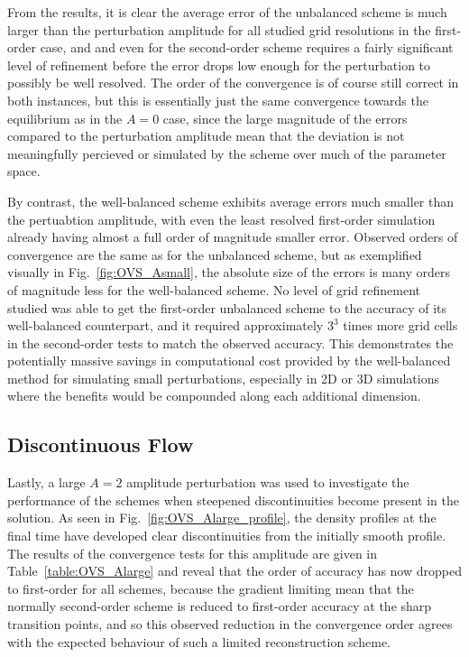From the results, it is clear the average error of the unbalanced scheme is much larger than the perturbation amplitude for all studied grid resolutions in the first-order case, and and even for the second-order scheme requires a fairly significant level of refinement before the error drops low enough for the perturbation to possibly be well resolved. The order of the convergence is of course still correct in both instances, but this is essentially just the same convergence towards the equilibrium as in the $A=0$ case, since the large magnitude of the errors compared to the perturbation amplitude mean that the deviation is not meaningfully percieved or simulated by the scheme over much of the parameter space.

By contrast, the well-balanced scheme exhibits average errors much smaller than the pertuabtion amplitude, with even the least resolved first-order simulation already having almost a full order of magnitude smaller error. Observed orders of convergence are the same as for the unbalanced scheme, but as exemplified visually in Fig.~\ref{fig:OVS_Asmall}, the absolute size of the errors is many orders of magnitude less for the well-balanced scheme. No level of grid refinement studied was able to get the first-order unbalanced scheme to the accuracy of its well-balanced counterpart, and it required approximately $3^3$ times more grid cells in the second-order tests to match the observed accuracy. This demonstrates the potentially massive savings in computational cost provided by the well-balanced method for simulating small perturbations, especially in 2D or 3D simulations where the benefits would be compounded along each additional dimension.

\subsection{Discontinuous Flow}

Lastly, a large $A=2$ amplitude perturbation was used to investigate the performance of the schemes when steepened discontinuities become present in the solution. As seen in Fig.~\ref{fig:OVS_Alarge_profile}, the density profiles at the final time have developed clear discontinuities from the initially smooth profile. The results of the convergence tests for this amplitude are given in Table~\ref{table:OVS_Alarge} and reveal that the order of accuracy has now dropped to first-order for all schemes, because the gradient limiting mean that the normally second-order scheme is reduced to first-order accuracy at the sharp transition points, and so this observed reduction in the convergence order agrees with the expected behaviour of such a limited reconstruction scheme.

